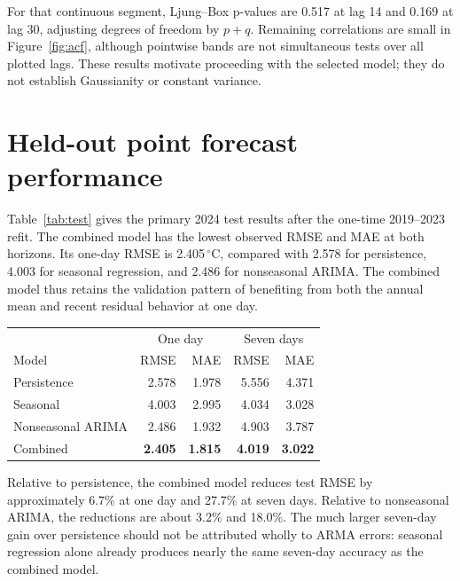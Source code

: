 \documentclass{article}
\begin{document}
For that continuous segment, Ljung--Box p-values are 0.517 at lag 14 and 0.169
at lag 30, adjusting degrees of freedom by $p+q$. Remaining correlations are
small in Figure~\ref{fig:acf}, although pointwise bands are not simultaneous
tests over all plotted lags. These results motivate proceeding with the selected
model; they do not establish Gaussianity or constant variance.

\newpage
\section{Held-out point forecast performance}
Table~\ref{tab:test} gives the primary 2024 test results after the one-time
2019--2023 refit. The combined model has the lowest observed RMSE and MAE at
both horizons. Its one-day RMSE is 2.405\,$^\circ$C, compared with 2.578 for
persistence, 4.003 for seasonal regression, and 2.486 for nonseasonal ARIMA.
The combined model thus retains the validation pattern of benefiting from
both the annual mean and recent residual behavior at one day.

\begin{center}
\label{tab:test}
\begin{tabular}{lrrrr}
\toprule
& \multicolumn{2}{c}{One day} & \multicolumn{2}{c}{Seven days}\\
Model & RMSE & MAE & RMSE & MAE\\
\midrule
Persistence & 2.578 & 1.978 & 5.556 & 4.371\\
Seasonal & 4.003 & 2.995 & 4.034 & 3.028\\
Nonseasonal ARIMA & 2.486 & 1.932 & 4.903 & 3.787\\
Combined & \textbf{2.405} & \textbf{1.815} & \textbf{4.019} & \textbf{3.022}\\
\bottomrule
\end{tabular}
\end{center}

Relative to persistence, the combined model reduces test RMSE by approximately
6.7\% at one day and 27.7\% at seven days. Relative to nonseasonal ARIMA,
the reductions are about 3.2\% and 18.0\%. The much larger seven-day gain over
persistence should not be attributed wholly to ARMA errors: seasonal regression
alone already produces nearly the same seven-day accuracy as the combined model.
\end{document}
